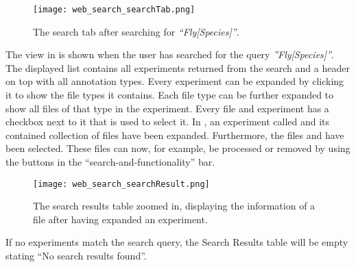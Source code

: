 \begin{figure}[h]
\centering
\texttt{[image: web\_search\_searchTab.png]}
\caption{\label{fig:web_search_searchTab}The search tab after searching for \textit{“Fly[Species]”}.}
\end{figure}

The view in  is shown when the user has searched for the query \textit{”Fly[Species]”}. The displayed list contains all experiments returned from the search and a header on top with all annotation types. Every experiment can be expanded by clicking it to show the file types it contains. Each file type can be further expanded to show all files of that type in the experiment. Every file and experiment has a checkbox next to it that is used to select it. In , an experiment called  and its contained collection of  files have been expanded. Furthermore, the files  and  have been selected. These files can now, for example, be processed or removed by using the buttons in the “search-and-functionality” bar.

\begin{figure}[h]
\centering
\texttt{[image: web\_search\_searchResult.png]}
\caption{\label{fig:web_search_searchResult}The search results table zoomed in, displaying the information of a  file after having expanded an experiment.}
\end{figure}

If no experiments match the search query, the Search Results table will be empty stating “No search results found”.

\pagebreak
